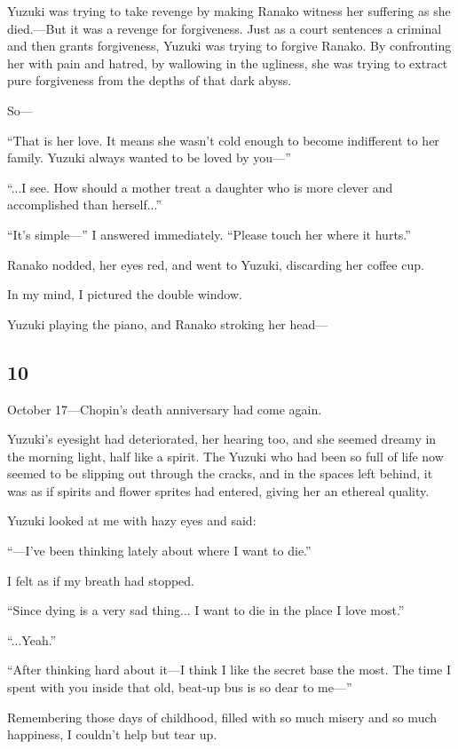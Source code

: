 \documentclass[
    a4paper,
    12pt,
    twoside,
    openany,
    UTF8,
    fontset=windows
]{ctexbook}
\begin{document}
Yuzuki was trying to take revenge by making Ranako witness her suffering as she died.---But it was a revenge for forgiveness. Just as a court sentences a criminal and then grants forgiveness, Yuzuki was trying to forgive Ranako. By confronting her with pain and hatred, by wallowing in the ugliness, she was trying to extract pure forgiveness from the depths of that dark abyss.

So---

``That is her love. It means she wasn't cold enough to become indifferent to her family. Yuzuki always wanted to be loved by you---''

``...I see. How should a mother treat a daughter who is more clever and accomplished than herself...''

``It's simple---'' I answered immediately. ``Please touch her where it hurts.''

Ranako nodded, her eyes red, and went to Yuzuki, discarding her coffee cup.

In my mind, I pictured the double window.

Yuzuki playing the piano, and Ranako stroking her head---


\subsection*{10}

October 17---Chopin's death anniversary had come again.

Yuzuki's eyesight had deteriorated, her hearing too, and she seemed dreamy in the morning light, half like a spirit. The Yuzuki who had been so full of life now seemed to be slipping out through the cracks, and in the spaces left behind, it was as if spirits and flower sprites had entered, giving her an ethereal quality.

Yuzuki looked at me with hazy eyes and said:

``---I've been thinking lately about where I want to die.''

I felt as if my breath had stopped.

``Since dying is a very sad thing... I want to die in the place I love most.''

``...Yeah.''

``After thinking hard about it---I think I like the secret base the most. The time I spent with you inside that old, beat-up bus is so dear to me---''

Remembering those days of childhood, filled with so much misery and so much happiness, I couldn't help but tear up.
\end{document}
